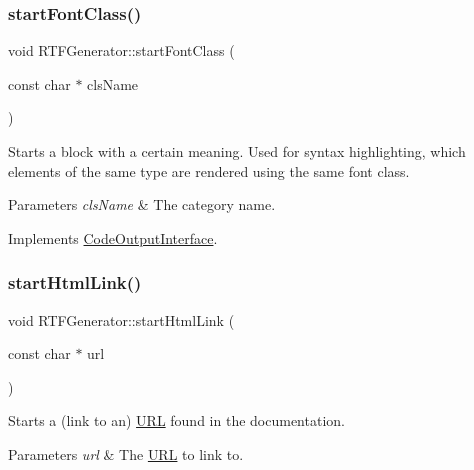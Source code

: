 \mbox{\label{class_r_t_f_generator_a84114371fc0f3865e0321c2df8ce0ae9}} 
\subsubsection{\texorpdfstring{startFontClass()}{startFontClass()}}
{\footnotesize\ttfamily void R\+T\+F\+Generator\+::start\+Font\+Class (\begin{DoxyParamCaption}\item[{const char $\ast$}]{cls\+Name }\end{DoxyParamCaption})\hspace{0.3cm}{\ttfamily [virtual]}}

Starts a block with a certain meaning. Used for syntax highlighting, which elements of the same type are rendered using the same \textquotesingle{}font class\textquotesingle{}. 
\begin{DoxyParams}{Parameters}
{\em cls\+Name} & The category name. \\
\hline
\end{DoxyParams}


Implements \mbox{\hyperlink{class_code_output_interface_ac90f75968cdcf127e0b02938bdb49d87}{Code\+Output\+Interface}}.

\mbox{\label{class_r_t_f_generator_a265ab601396745bb97d5c6cee59329d6}} 
\subsubsection{\texorpdfstring{startHtmlLink()}{startHtmlLink()}}
{\footnotesize\ttfamily void R\+T\+F\+Generator\+::start\+Html\+Link (\begin{DoxyParamCaption}\item[{const char $\ast$}]{url }\end{DoxyParamCaption})\hspace{0.3cm}{\ttfamily [virtual]}}

Starts a (link to an) \mbox{\hyperlink{struct_u_r_l}{U\+RL}} found in the documentation. 
\begin{DoxyParams}{Parameters}
{\em url} & The \mbox{\hyperlink{struct_u_r_l}{U\+RL}} to link to. \\
\hline
\end{DoxyParams}


